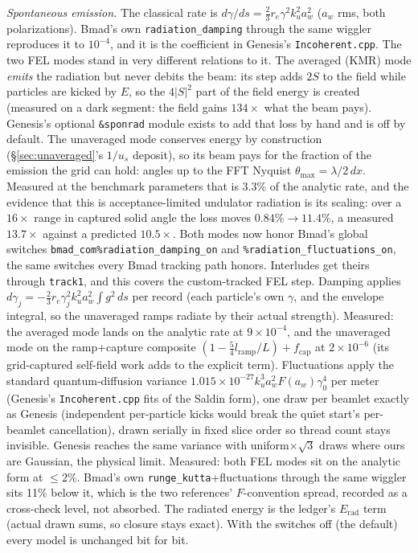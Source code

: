 \documentclass[11pt]{article}
\newcommand{\code}[1]{\texttt{#1}}
\begin{document}
\emph{Spontaneous emission.} The classical rate is
$d\gamma/ds = \tfrac23 r_e \gamma^2 k_u^2 a_w^2$ ($a_w$ rms, both polarizations). Bmad's
own \code{radiation\_damping} through the same wiggler reproduces it to $10^{-4}$, and
it is the coefficient in Genesis's \code{Incoherent.cpp}. The two FEL modes stand in
very different relations to it. The averaged (KMR) mode \emph{emits} the radiation but
never debits the beam: its step adds $2S$ to the field while particles are kicked by
$E$, so the $4|S|^2$ part of the field energy is created (measured on a dark segment:
the field gains $134\times$ what the beam pays). Genesis's optional \code{\&sponrad}
module exists to add that loss by hand and is off by default. The unaveraged mode
conserves energy by construction (\S\ref{sec:unaveraged}'s $1/u_s$ deposit), so its
beam pays for the fraction of the emission the grid can hold: angles up to the FFT
Nyquist $\theta_{\max} = \lambda/2\,dx$. Measured at the benchmark parameters that is
3.3\% of the analytic rate, and the evidence that this is acceptance-limited undulator
radiation is its scaling: over a $16\times$ range in captured solid angle the loss
moves $0.84\% \to 11.4\%$, a measured $13.7\times$ against a predicted $10.5\times$.
Both modes now honor Bmad's global switches
\code{bmad\_com\%radiation\_damping\_on} and
\code{\%radiation\_fluctuations\_on}, the same switches every Bmad tracking path
honors. Interludes get theirs through \code{track1}, and this covers the custom-tracked
FEL step. Damping applies $d\gamma_j = -\tfrac23 r_e \gamma_j^2 k_u^2 a_w^2
\int g^2\,ds$ per record (each particle's own $\gamma$, and the envelope integral, so
the unaveraged ramps radiate by their actual strength). Measured: the averaged mode
lands on the analytic rate at $9\times10^{-4}$, and the unaveraged mode on the
ramp+capture composite $(1 - \tfrac{5}{4}l_{\mathrm{ramp}}/L) + f_{\mathrm{cap}}$
at $2\times10^{-6}$ (its grid-captured self-field work adds to the explicit term).
Fluctuations apply the standard quantum-diffusion variance
$1.015\times10^{-27} k_u^3 a_w^2 F(a_w)\gamma_0^4$ per meter (Genesis's
\code{Incoherent.cpp} fits of the Saldin form), one draw per
beamlet exactly as Genesis (independent per-particle kicks would break the quiet
start's per-beamlet cancellation), drawn serially in fixed slice order so thread
count stays invisible. Genesis reaches the same variance with uniform$\times\sqrt3$
draws where ours are Gaussian, the physical limit. Measured: both FEL modes sit on the
analytic form at $\le 2\%$. Bmad's own \code{runge\_kutta}+fluctuations through the
same wiggler sits 11\% below it, which is the two references' $F$-convention spread,
recorded as a cross-check level, not absorbed. The radiated energy is the ledger's
$E_{\mathrm{rad}}$ term (actual drawn sums, so closure stays exact). With the
switches off (the default) every model is unchanged bit for bit.
\end{document}
